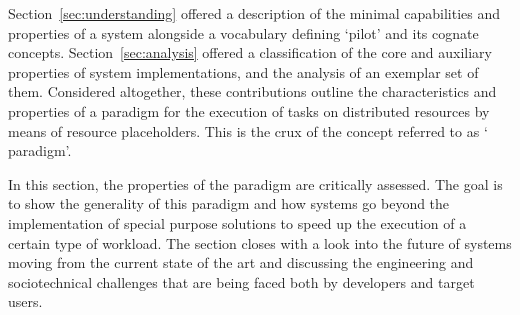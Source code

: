 \documentclass{sig-alternate}
\begin{document}

Section~\ref{sec:understanding} offered a description of the minimal
capabilities and properties of a \pilot system alongside a vocabulary defining
`pilot' and its cognate concepts. Section~\ref{sec:analysis} offered a
classification of the core and auxiliary properties of \pilot system
implementations, and the analysis of an exemplar set of them. Considered
altogether, these contributions outline the characteristics and properties of a
paradigm for the execution of tasks on distributed resources by means of
resource placeholders. This is the crux of the concept referred to as `\pilot
paradigm'.

In this section, the properties of the \pilot paradigm are critically assessed.
The goal is to show the generality of this paradigm and how \pilot systems go
beyond the implementation of special purpose solutions to speed up the execution
of a certain type of workload. The section closes with a look into the future of
\pilot systems moving from the current state of the art and discussing the
engineering and sociotechnical challenges that are being faced both by
developers and target users.


\end{document}
